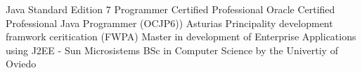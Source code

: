 %
%
%


\begin{scholarship}
					{Java Standard Edition 7 Programmer Certified Professional}
					{Oracle Certified Professional Java Programmer (OCJP6))}
					{Asturias Principality development framwork ceritication (FWPA)}
					{Master in development of Enterprise Applications using J2EE - Sun Microsistems}
					{BSc in Computer Science by the Univertiy of Oviedo}
\end{scholarship}